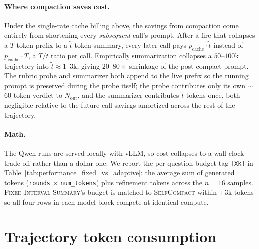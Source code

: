 \documentclass{article}
\newcommand{\method}{\textsc{{SelfCompact}}}
\begin{document}
\paragraph{Where compaction saves cost.} Under the single-rate cache
billing above, the savings from compaction come entirely from
shortening every \emph{subsequent} call's prompt. After a fire that
collapses a $T$-token prefix to a $\tilde t$-token summary, every later
call pays $p_{\text{cache}} \cdot \tilde t$ instead of
$p_{\text{cache}} \cdot T$, a $T/\tilde t$ ratio per call.
Empirically summarization collapses a $50$--$100$k trajectory into
$\tilde t \approx 1$--$3$k, giving $20$--$80\times$ shrinkage of the
post-compact prompt. The rubric probe and summarizer both append to
the live prefix so the running prompt is preserved during the probe
itself; the probe contributes only its own $\sim$60-token verdict to
$N_{\text{out}}$, and the summarizer contributes $\tilde t$ tokens
once, both negligible relative to the future-call savings amortized
across the rest of the trajectory.

\paragraph{Math.} The Qwen runs are served locally with vLLM, so cost
collapses to a wall-clock trade-off rather than a dollar one. We report
the per-question budget tag \texttt{[Xk]} in
Table~\ref{tab:performance_fixed_vs_adaptive}: the average sum of
generated tokens (\texttt{rounds} $\times$ \texttt{num\_tokens}) plus
refinement tokens across the $n=16$ samples. \textsc{Fixed-Interval
Summary}'s budget is matched to \method{} within $\pm 3$k tokens so
all four rows in each model block compete at identical compute.


\clearpage

\section{Trajectory token consumption}
\label{appendix:tokens}
\end{document}
